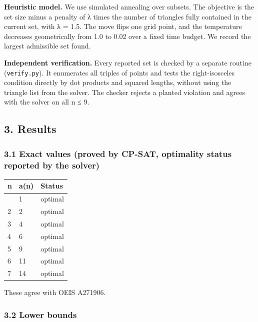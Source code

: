 \documentclass[
  11pt,
]{article}
\begin{document}
\textbf{Heuristic model.} We use simulated annealing over subsets. The
objective is the set size minus a penalty of λ times the number of
triangles fully contained in the current set, with λ = 1.5. The move
flips one grid point, and the temperature decreases geometrically from
1.0 to 0.02 over a fixed time budget. We record the largest admissible
set found.

\textbf{Independent verification.} Every reported set is checked by a
separate routine (\texttt{verify.py}). It enumerates all triples of
points and tests the right-isosceles condition directly by dot products
and squared lengths, without using the triangle list from the solver.
The checker rejects a planted violation and agrees with the solver on
all n ≤ 9.

\subsection{3. Results}\label{results}

\subsubsection{3.1 Exact values (proved by CP-SAT, optimality status
reported by the
solver)}\label{exact-values-proved-by-cp-sat-optimality-status-reported-by-the-solver}

\begin{longtable}[]{@{}lll@{}}
\toprule\noalign{}
n & a(n) & Status \\
\midrule\noalign{}
\endhead
\bottomrule\noalign{}
\endlastfoot
1 & 1 & optimal \\
2 & 2 & optimal \\
3 & 4 & optimal \\
4 & 6 & optimal \\
5 & 9 & optimal \\
6 & 11 & optimal \\
7 & 14 & optimal \\
\end{longtable}

These agree with OEIS A271906.

\subsubsection{3.2 Lower bounds}\label{lower-bounds}
\end{document}
